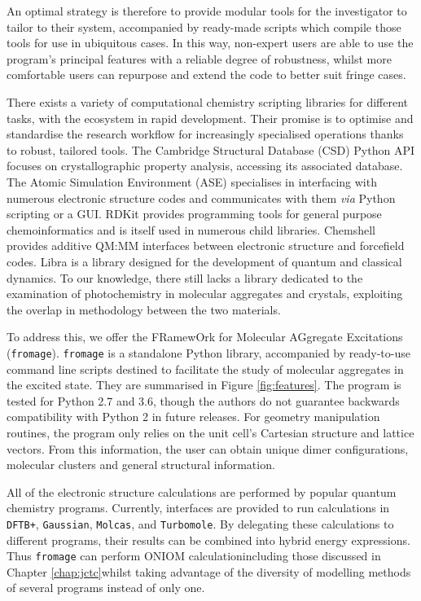 An optimal strategy is therefore to provide modular tools for the investigator to tailor to their system, accompanied by ready-made scripts which compile those tools for use in ubiquitous cases. In this way, non-expert users are able to use the program's principal features with a reliable degree of robustness, whilst more comfortable users can repurpose and extend the code to better suit fringe cases.

There exists a variety of computational chemistry scripting libraries for different tasks, with the ecosystem in rapid development. Their promise is to optimise and standardise the research workflow for increasingly specialised operations thanks to robust, tailored tools. The Cambridge Structural Database (CSD) Python API\cite{Groom2016} focuses on crystallographic property analysis, accessing its associated database. The Atomic Simulation Environment (ASE)\cite{Larsen2017} specialises in interfacing with numerous electronic structure codes and communicates with them \textit{via} Python scripting or a GUI. RDKit\cite{rdkit} provides programming tools for general purpose chemoinformatics and is itself used in numerous child libraries. Chemshell provides additive QM:MM interfaces between electronic structure and forcefield codes.\cite{Lu2019} Libra is a library designed for the development of quantum and classical dynamics.\cite{Akimov2016} To our knowledge, there still lacks a library dedicated to the examination of photochemistry in molecular aggregates and crystals, exploiting the overlap in methodology between the two materials.

To address this, we offer the FRamewOrk for Molecular AGgregate Excitations (\texttt{fromage}). \texttt{fromage} is a standalone Python library, accompanied by ready-to-use command line scripts destined to facilitate the study of molecular aggregates in the excited state. They are summarised in Figure \ref{fig:features}. The program is tested for Python 2.7 and 3.6, though the authors do not guarantee backwards compatibility with Python 2 in future releases. For geometry manipulation routines, the program only relies on the unit cell's Cartesian structure and lattice vectors. From this information, the user can obtain unique dimer configurations, molecular clusters and general structural information.

All of the electronic structure calculations are performed by popular quantum chemistry programs. Currently, interfaces are provided to run calculations in \texttt{DFTB+},\cite{Aradi2007} \texttt{Gaussian},\cite{g16} \texttt{Molcas},\cite{Aquilante2016} and \texttt{Turbomole}.\cite{TURBOMOLE} By delegating these calculations to different programs, their results can be combined into hybrid energy expressions. Thus \texttt{fromage} can perform ONIOM calculation\textemdash{}including those discussed in Chapter \ref{chap:jctc}\textemdash{}whilst taking advantage of the diversity of modelling methods of several programs instead of only one.\cite{Rivera2019}


